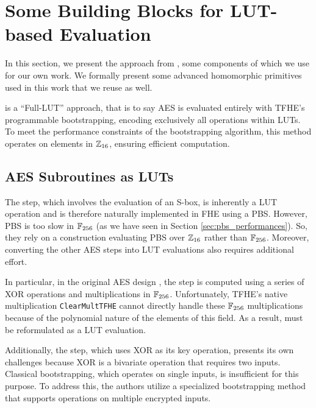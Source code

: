 
\section{Some Building Blocks for \gls{LUT}-based Evaluation}
\label{sec:previous-blocks}


In this section, we present the approach from \cite{DBLP:conf/wahc/TramaCBS23}, some components of which we use for our own work. We formally present some advanced homomorphic primitives used in this work that we reuse as well.


\cite{DBLP:conf/wahc/TramaCBS23} is a ``Full-\gls{LUT}'' approach, that is to say \gls{AES} is evaluated entirely with \gls{TFHE}'s programmable bootstrapping, encoding exclusively all operations within LUTs. To meet the performance constraints of the bootstrapping algorithm, this method operates on elements in $\mathbb{Z}_{16}$, ensuring efficient computation.

\subsection{AES Subroutines as LUTs}

The \SubBytes step, which involves the evaluation of an S-box, is inherently a \gls{LUT} operation and is therefore naturally implemented in \gls{FHE} using a \gls{PBS}. However, \gls{PBS} is too slow in $\mathbb{F}_{256}$ (as we have seen in Section \ref{sec:pbs_performances}). So, they rely on a construction evaluating \gls{PBS} over $\mathbb{Z}_{16}$ rather than $\mathbb{F}_{256}$. Moreover, converting the other \gls{AES} steps into \gls{LUT} evaluations also requires additional effort.

In particular, in the original \gls{AES} design \cite{aes-original}, the \MixColumns step is computed using a series of XOR operations and multiplications in $\mathbb{F}_{256}$. Unfortunately, \gls{TFHE}’s native multiplication \texttt{ClearMultTFHE} cannot directly handle these $\mathbb{F}_{256}$ multiplications because of the polynomial nature of the elements of this field. As a result, \MixColumns must be reformulated as a \gls{LUT} evaluation.

Additionally, the \AddRoundKey step, which uses XOR as its key operation, presents its own challenges because XOR is a bivariate operation that requires two inputs. Classical bootstrapping, which operates on single inputs, is insufficient for this purpose. To address this, the authors utilize a specialized bootstrapping method that supports operations on multiple encrypted inputs.

